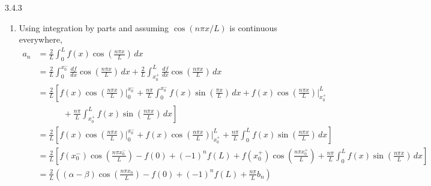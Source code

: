 \documentclass{article}
\theoremstyle{definition}
\begin{document}
\begin{prob}{3.4.3}
\begin{enumerate}[label=\alph*.)]
			\item Using integration by parts and assuming $ \cos(n\pi x/L) $ is continuous everywhere,
				\begin{align*}
					a_n &= \frac{2}{L} \int_0^L f(x) \cos\left( \frac{n\pi x}{L} \right) \, dx \\
					&= \frac{2}{L} \int_{0}^{x_0^-} \frac{df}{dx} \cos\left( \frac{n\pi x}{L} \right) \, dx + \frac{2}{L} \int_{x_0^+}^{L} \frac{df}{dx} \cos\left( \frac{n\pi x}{L} \right) \, dx \\
					&= \frac{2}{L}\left[ f(x)\cos\left( \frac{n\pi x}{L} \right) \bigg|_{0}^{x_0^-} + \frac{n\pi}{L} \int_{0}^{x_0^-} f(x) \sin\left( \frac{\pi x}{L} \right) \, dx + f(x)\cos\left( \frac{n\pi x}{L} \right) \bigg|_{x_0^+}^{L} \right. \\
					& \left. \qquad \quad  + \frac{n\pi}{L} \int_{x_0^+}^{L} f(x)\sin\left( \frac{n\pi x}{L} \right) \, dx \right] \\
					&= \frac{2}{L} \left[ f(x)\cos\left( \frac{n\pi x}{L} \right) \bigg|_{0}^{x_0^-} + f(x)\cos\left( \frac{n\pi x}{L} \right) \bigg|_{x_0^+}^{L} + \frac{n\pi}{L} \int_0^L f(x) \sin\left( \frac{n\pi x}{L} \right) \, dx \right] \\
					&= \frac{2}{L} \left[ f(x_0^-) \cos\left( \frac{n\pi x_0^-}{L} \right) - f(0) + (-1)^n f(L) + f(x_0^+) \cos\left( \frac{n\pi x_0^+}{L} \right) + \frac{n\pi}{L} \int_0^L f(x) \sin\left( \frac{n\pi x}{L} \right) \, dx \right] \\
					&= \boxed{ \frac{2}{L} \left( (\alpha - \beta)\cos\left( \frac{n\pi x_0}{L} \right) - f(0) + (-1)^n f(L) + \frac{n\pi}{L}b_n  \right) }
				\end{align*}
		\end{enumerate}
	\end{prob}
\end{document}
